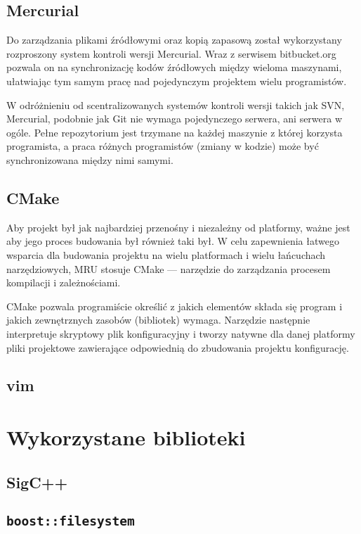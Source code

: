 \subsection{Mercurial}
\par
Do zarządzania plikami źródłowymi oraz kopią zapasową został wykorzystany rozproszony system kontroli wersji Mercurial. Wraz z serwisem bitbucket.org pozwala on na synchronizację kodów źródłowych między wieloma maszynami, ułatwiając tym samym pracę nad pojedynczym projektem wielu programistów.
\par
W odróżnieniu od scentralizowanych systemów kontroli wersji takich jak SVN, Mercurial, podobnie jak Git nie wymaga pojedynczego serwera, ani serwera w ogóle. Pełne repozytorium jest trzymane na każdej maszynie z której korzysta programista, a praca różnych programistów (zmiany w kodzie) może być synchronizowana między nimi samymi.

\subsection{CMake}
\par
Aby projekt był jak najbardziej przenośny i niezależny od platformy, ważne jest aby jego proces budowania był również taki był.
W celu zapewnienia łatwego wsparcia dla budowania projektu na wielu platformach i wielu łańcuchach narzędziowych, MRU stosuje CMake --- narzędzie do zarządzania procesem kompilacji i zależnościami.
\par
CMake pozwala programiście określić z jakich elementów składa się program i jakich zewnętrznych zasobów (bibliotek) wymaga. Narzędzie następnie interpretuje skryptowy plik konfiguracyjny i tworzy natywne dla danej platformy pliki projektowe zawierające odpowiednią do zbudowania projektu konfigurację.

\subsection{vim}

\section{Wykorzystane biblioteki}

\subsection{SigC++}

\subsection{\texttt{boost::filesystem}}

